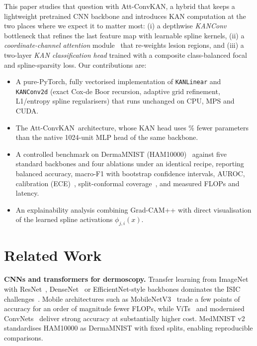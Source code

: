 \documentclass[conference]{IEEEtran}
\newcommand{\ours}{Att-ConvKAN}
\begin{document}
This paper studies that question with \ours, a hybrid that keeps a lightweight pretrained CNN backbone and introduces KAN computation at the two places where we expect it to matter most: (i) a depthwise \emph{KANConv} bottleneck that refines the last feature map with learnable spline kernels, (ii) a \emph{coordinate-channel attention} module~\cite{woo2018cbam,hou2021coordatt} that re-weights lesion regions, and (iii) a two-layer \emph{KAN classification head} trained with a composite class-balanced focal~\cite{lin2017focal,cui2019classbalanced} and spline-sparsity loss. Our contributions are:
\begin{itemize}
\item A pure-PyTorch, fully vectorised implementation of \texttt{KANLinear} and \texttt{KANConv2d} (exact Cox-de Boor recursion, adaptive grid refinement, L1/entropy spline regularisers) that runs unchanged on CPU, MPS and CUDA.
\item The \ours\ architecture, whose KAN head uses \% fewer parameters than the native 1024-unit MLP head of the same backbone.
\item A controlled benchmark on DermaMNIST (HAM10000)~\cite{yang2023medmnist} against five standard backbones and four ablations under an identical recipe, reporting balanced accuracy, macro-F1 with bootstrap confidence intervals, AUROC, calibration (ECE)~\cite{guo2017calibration}, split-conformal coverage~\cite{angelopoulos2021gentle}, and measured FLOPs and latency.
\item An explainability analysis combining Grad-CAM++ with direct visualisation of the learned spline activations $\phi_{j,i}(x)$.
\end{itemize}

\section{Related Work}
\textbf{CNNs and transformers for dermoscopy.} Transfer learning from ImageNet with ResNet~\cite{he2016resnet}, DenseNet~\cite{huang2017densenet} or EfficientNet-style backbones dominates the ISIC challenges~\cite{codella2019isic}. Mobile architectures such as MobileNetV3~\cite{howard2019mobilenetv3} trade a few points of accuracy for an order of magnitude fewer FLOPs, while ViTs~\cite{dosovitskiy2021vit} and modernised ConvNets~\cite{liu2022convnext} deliver strong accuracy at substantially higher cost. MedMNIST v2~\cite{yang2023medmnist} standardises HAM10000 as DermaMNIST with fixed splits, enabling reproducible comparisons.
\end{document}
